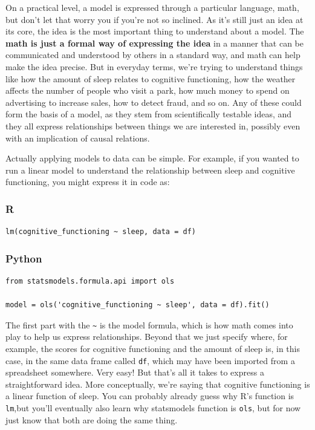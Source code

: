 \documentclass[
  letterpaper,
]{krantz}
\begin{document}
On a practical level, a model is expressed through a particular
language, math, but don't let that worry you if you're not so inclined.
As it's still just an idea at its core, the idea is the most important
thing to understand about a model. The \textbf{math is just a formal way
of expressing the idea} in a manner that can be communicated and
understood by others in a standard way, and math can help make the idea
precise. But in everyday terms, we're trying to understand things like
how the amount of sleep relates to cognitive functioning, how the
weather affects the number of people who visit a park, how much money to
spend on advertising to increase sales, how to detect fraud, and so on.
Any of these could form the basis of a model, as they stem from
scientifically testable ideas, and they all express relationships
between things we are interested in, possibly even with an implication
of causal relations.

Actually applying models to data can be simple. For example, if you
wanted to run a linear model to understand the relationship between
sleep and cognitive functioning, you might express it in code as:

\subsubsection{R}

\begin{verbatim}
lm(cognitive_functioning ~ sleep, data = df)
\end{verbatim}

\subsubsection{Python}

\begin{verbatim}
from statsmodels.formula.api import ols

model = ols('cognitive_functioning ~ sleep', data = df).fit()
\end{verbatim}

The first part with the \texttt{\textasciitilde{}} is the model formula,
which is how math comes into play to help us express relationships.
Beyond that we just specify where, for example, the scores for cognitive
functioning and the amount of sleep is, in this case, in the same data
frame called \texttt{df}, which may have been imported from a
spreadsheet somewhere. Very easy! But that's all it takes to express a
straightforward idea. More conceptually, we're saying that cognitive
functioning is a linear function of sleep. You can probably already
guess why R's function is \texttt{lm},but you'll eventually also learn
why {statsmodels} function is \texttt{ols}, but for now just know that
both are doing the same thing.
\end{document}
